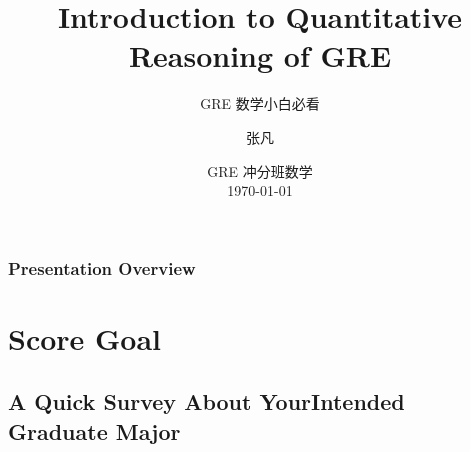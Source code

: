 \documentclass[
	11pt, %
]{beamer}
\title[Into to QR]{Introduction to Quantitative Reasoning of GRE} %
\subtitle{GRE 数学小白必看} %
\author[张凡]{张凡} %
\institute[XDF]{新东方国际教育 \\ \smallskip \textit{zhangfan@xdf.cn}} %
\date[\today]{GRE 冲分班数学 \\ \today} %
\begin{document}

\begin{frame}
	\titlepage %
\end{frame}



\begin{frame}
	\frametitle{Presentation Overview} %
	
	\tableofcontents %
\end{frame}


\section{Score Goal}
\subsection{A Quick Survey About YourIntended Graduate Major}
\end{document}
